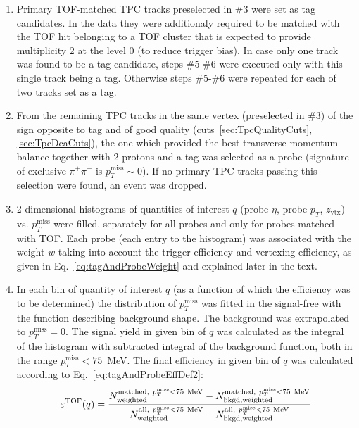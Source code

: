 \begin{enumerate}
 \item Primary TOF-matched TPC tracks preselected in \#3 were set as tag candidates. In the data they were additionaly required to be matched with the TOF hit belonging to a TOF cluster that is expected to provide multiplicity 2 at the level 0 (to reduce trigger bias). In case only one track was found to be a tag candidate, steps \#5-\#6 were executed only with this single track being a tag. Otherwise steps \#5-\#6 were repeated for each of two tracks set as a tag.\\[-20pt]%
 \item From the remaining TPC tracks in the same vertex (preselected in \#3) of the sign opposite to tag and of good quality (cuts~\ref{sec:TpcQualityCuts},\ref{sec:TpcDcaCuts}), the one which provided the best transverse momentum balance together with 2 protons and a tag was selected as a probe (signature of exclusive $\pi^{+}\pi^{-}$ is  $p_{T}^{\text{miss}}\sim0$). If no primary TPC tracks passing this selection were found, an event was dropped.\\[-20pt]%
 \item 2-dimensional histograms of quantities of interest $q$ (probe $\eta$, probe $p_{T}$, $z_{\text{vtx}}$) vs. $p_{T}^{\text{miss}}$ were filled, separately for all probes and only for probes matched with TOF. Each probe (each entry to the histogram) was associated with the weight $w$ taking into account the trigger efficiency and vertexing efficiency, as given in Eq.~\eqref{eq:tagAndProbeWeight} and explained later in the text.\\[-20pt]%
 \item In each bin of quantity of interest $q$ (as a function of which the efficiency was to be determined) the distribution of $p_{T}^{\text{miss}}$ was fitted  in the signal-free with the function describing background shape. The background was extrapolated to $p_{T}^{\text{miss}}=0$. The signal yield in given bin of $q$ was calculated as the integral of the histogram with subtracted integral of the background function, both in the range $p_{T}^{\text{miss}}<75$~MeV. The final efficiency in given bin of $q$ was calculated according to Eq.~\eqref{eq:tagAndProbeEffDef2}:\vspace{-4pt}
 \begin{equation}\label{eq:tagAndProbeEffDef2}
  \varepsilon^{\text{TOF}}(q) = \frac{N_\text{weighted}^{\text{matched},~p_{T}^{\text{miss}}<75~\text{MeV}} - N_\text{bkgd,weighted}^{\text{matched},~p_{T}^{\text{miss}}<75~\text{MeV}} }{ N_\text{weighted}^{\text{all},~p_{T}^{\text{miss}}<75~\text{MeV}} - N_\text{bkgd,weighted}^{\text{all},~p_{T}^{\text{miss}}<75~\text{MeV}} }\vspace*{-25pt}
 \end{equation}
\end{enumerate}
